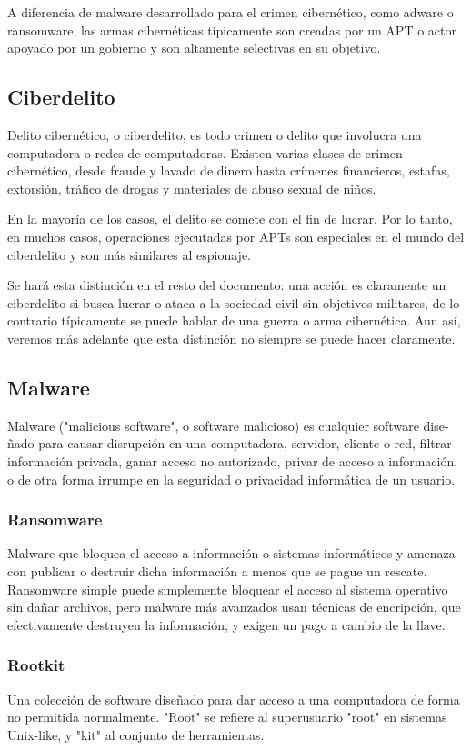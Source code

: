 \documentclass{article}
\begin{document}
A diferencia de malware desarrollado para el crimen cibernético, como adware o ransomware, las armas cibernéticas típicamente son creadas por un APT o actor apoyado por un gobierno y son altamente selectivas en su objetivo.

\subsection{Ciberdelito}
Delito cibernético, o ciberdelito, es todo crimen o delito que involucra una computadora o redes de computadoras. Existen varias clases de crimen cibernético, desde fraude y lavado de dinero hasta crímenes financieros, estafas, extorsión, tráfico de drogas y materiales de abuso sexual de niños.

En la mayoría de los casos, el delito se comete con el fin de lucrar. Por lo tanto, en muchos casos, operaciones ejecutadas por APTs son especiales en el mundo del ciberdelito y son más similares al espionaje.

Se hará esta distinción en el resto del documento: una acción es claramente un ciberdelito si busca lucrar o ataca a la sociedad civil sin objetivos militares, de lo contrario típicamente se puede hablar de una guerra o arma cibernética. Aun así, veremos más adelante que esta distinción no siempre se puede hacer claramente.

\subsection{Malware}
Malware ("malicious software", o software malicioso) es cualquier software dise-ñado para causar disrupción en una computadora, servidor, cliente o red, filtrar información privada, ganar acceso no autorizado, privar de acceso a información, o de otra forma irrumpe en la seguridad o privacidad informática de un usuario.

\subsubsection{Ransomware}
Malware que bloquea el acceso a información o sistemas informáticos y amenaza con publicar o destruir dicha información a menos que se pague un rescate. Ransomware simple puede simplemente bloquear el acceso al sistema operativo sin dañar archivos, pero malware más avanzados usan técnicas de encripción, que efectivamente destruyen la información, y exigen un pago a cambio de la llave.

\subsubsection{Rootkit}
Una colección de software diseñado para dar acceso a una computadora de forma no permitida normalmente. "Root" se refiere al superusuario "root" en sistemas Unix-like, y "kit" al conjunto de herramientas.
\end{document}
